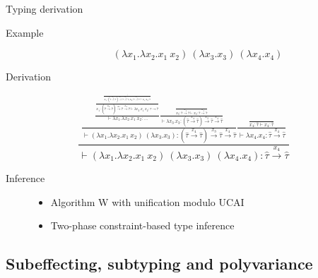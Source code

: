 \documentclass{beamer}
\newcommand{\Abs}[2]{\lambda #1.#2}
\newcommand{\App}[2]{#1\ #2}
\newcommand{\TFun}[2]{#1 \to #2}
\newcommand{\AFun}[3]{#1 \xrightarrow{#2} #3}
\newcommand{\Judge}[3][\Gamma]{#1 \vdash #2 : #3}
\newcommand{\tauhat}{\widehat\tau}
\begin{document}
\begin{frame}{Typing derivation}
	\begin{description}
		\item[Example]
			\[\left(\Abs{x_1}{\Abs{x_2}{\App{x_1}{x_2}}}\right)\ \left(\Abs{x_3}{x_3}\right)\ \left(\Abs{x_4}{x_4}\right) \]
		\item[Derivation]
	\end{description}
	\vspace{1em}
	\begin{equation*}
		\frac{\frac{\frac{\frac{\frac{\vdots}
		                             {\Judge[x_1 : \AFun{\left(\AFun{\tauhat}{x_4}{\tauhat}\right)}{x_3}{\AFun{\tauhat}{x_4}{\tauhat}}, x_2 : \AFun{\tauhat}{x_4}{\tauhat}]{\App{x_1}{x_2}}{\tauhat}}}
		                       {\Judge[x_1 : \AFun{\left(\AFun{\tauhat}{x_4}{\tauhat}\right)}{x_3}{\AFun{\tauhat}{x_4}{\tauhat}}]{\Abs{x_2}{\App{x_1}{x_2}}}{\TFun{\tauhat}{\tauhat}}}}
		                 {\Judge[]{\Abs{x_1}{\Abs{x_2}{\App{x_1}{x_2}}}}{...}}
		            \frac{\frac{}{\Judge[x_3 : \AFun{\tauhat}{x_4}{\tauhat}]{x_3}{\AFun{\tauhat}{x_4}{\tauhat}}}}
		                 {\Judge[]{\Abs{x_3}{x_3}}{\AFun{\left(\AFun{\tauhat}{x_4}{\tauhat}\right)}{x_3}{\AFun{\tauhat}{x_4}{\tauhat}}}}}
		           {\Judge[]{\left(\Abs{x_1}{\Abs{x_2}{\App{x_1}{x_2}}}\right)\ \left(\Abs{x_3}{x_3}\right)}{\AFun{\left(\AFun{\tauhat}{x_4}{\tauhat}\right)}{x_3}{\AFun{\tauhat}{x_4}{\tauhat}}}}
		      \frac{\frac{}{\Judge[x_4 : \tauhat]{x_4}{\tauhat}}}
		                 {\Judge[]{\Abs{x_4}{x_4}}{\AFun{\tauhat}{x_4}{\tauhat}}}}
		     {\Judge[]{\left(\Abs{x_1}{\Abs{x_2}{\App{x_1}{x_2}}}\right)\ \left(\Abs{x_3}{x_3}\right)\ \left(\Abs{x_4}{x_4}\right)}{\AFun{\tauhat}{x_4}{\tauhat}}}
	\end{equation*}
	\vspace*{0.1em}
	\begin{description}
		\item[Inference] \begin{itemize}
			\item Algorithm W with unification modulo UCAI
			\item Two-phase constraint-based type inference
		\end{itemize}
	\end{description}
\end{frame}

\subsection{Subeffecting, subtyping and polyvariance}
\end{document}

